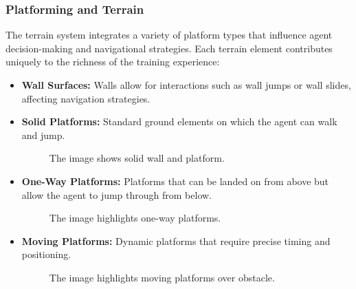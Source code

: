\documentclass[12pt,oneside,openright,a4paper]{cpe-english-project}
\begin{document}
\subsubsection{Platforming and Terrain}
The terrain system integrates a variety of platform types that influence agent decision-making and navigational strategies. Each terrain element contributes uniquely to the richness of the training experience:
\begin{itemize}
\item  \textbf{Wall Surfaces:} Walls allow for interactions such as wall jumps or wall slides, affecting navigation strategies.
\item  \textbf{Solid Platforms:} Standard ground elements on which the agent can walk and jump.
\begin{figure}[H]
\centering
{}
\caption{The image shows solid wall and platform.}\label{fig:SolidPlat}
\end{figure}
\item  \textbf{One-Way Platforms:} Platforms that can be landed on from above but allow the agent to jump through from below.
\begin{figure}[H]
\centering
{}
\caption{The image highlights one-way platforms.}\label{fig:OneWayPlat}
\end{figure}
\item  \textbf{Moving Platforms:} Dynamic platforms that require precise timing and positioning.
\begin{figure}[H]
\centering
{}
\caption{The image highlights moving platforms over obstacle.}\label{fig:MovingPlat}
\end{figure}
\end{itemize}
\end{document}
